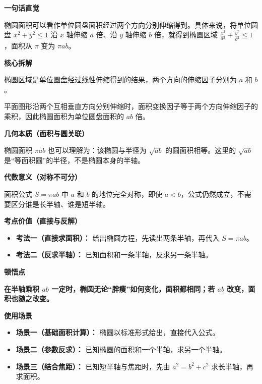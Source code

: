 \begin{explanationbox}
\textbf{\textcolor{CExplanation}{一句话直觉}}

椭圆面积可以看作单位圆盘面积经过两个方向分别伸缩得到。具体来说，将单位圆盘 $x^2+y^2\le 1$ 沿 $x$ 轴伸缩 $a$ 倍、沿 $y$ 轴伸缩 $b$ 倍，就得到椭圆区域 $\frac{x^2}{a^2}+\frac{y^2}{b^2}\le 1$，面积从 $\pi$ 变为 $\pi ab$。

\medskip
\textbf{\textcolor{CExplanation}{核心拆解}}
\begin{description}[style=nextline, leftmargin=2.8em, labelsep=0.5em, itemsep=0.45em]
    \item[\textbf{要点一（伸缩变换基础）：}] 椭圆区域是单位圆盘经过线性伸缩得到的结果，两个方向的伸缩因子分别为 $a$ 和 $b$。
    \item[\textbf{要点二（面积伸缩因子）：}] 平面图形沿两个互相垂直方向分别伸缩时，面积变换因子等于两个方向伸缩因子的乘积，因此椭圆面积为单位圆盘面积的 $ab$ 倍。
\end{description}

\medskip
\textbf{\textcolor{CExplanation}{几何本质（面积与圆关联）}}

椭圆面积 $\pi ab$ 也可以理解为：该椭圆与半径为 $\sqrt{ab}$ 的圆面积相等。这里的 $\sqrt{ab}$ 是“等面积圆”的半径，不是椭圆本身的半轴。

\medskip
\textbf{\textcolor{CExplanation}{代数意义（对称不可分）}}

面积公式 $S=\pi ab$ 中 $a$ 和 $b$ 的地位完全对称，即使 $a<b$，公式仍然成立，不需要区分谁是长半轴、谁是短半轴。

\medskip
\textbf{\textcolor{CExplanation}{考点价值（直接与反解）}}
\begin{itemize}[leftmargin=*, itemsep=0.5em, topsep=0.4em]
    \item \textbf{考法一（直接求面积）：} 给出椭圆方程，先读出两条半轴，再代入 $S=\pi ab$。
    \item \textbf{考法二（反求半轴）：} 已知面积和一条半轴，反求另一条半轴。
\end{itemize}

\medskip
\textbf{\textcolor{CExplanation}{顿悟点}}

\textbf{在半轴乘积 $ab$ 一定时，椭圆无论“胖瘦”如何变化，面积都相同；若 $ab$ 改变，面积也随之改变。}

\medskip
\textbf{\textcolor{CExplanation}{使用场景}}
\begin{itemize}[leftmargin=*, itemsep=0.5em, topsep=0.4em]
    \item \textbf{场景一（基础面积计算）：} 椭圆以标准形式给出，直接代入公式。
    \item \textbf{场景二（参数反求）：} 已知椭圆的面积和一个半轴，求另一个半轴。
    \item \textbf{场景三（结合焦距）：} 已知短半轴与焦距时，先由 $a^2=b^2+c^2$ 求长半轴，再求面积。
\end{itemize}
\end{explanationbox}